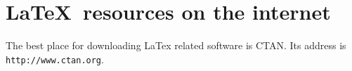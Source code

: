 \documentclass{article}
\begin{document}
\section{\textsf{\LaTeX\ resources on the internet}}
The best place for downloading LaTex related software is CTAN.
Its address is \texttt{http://www.ctan.org}.
\end{document}
